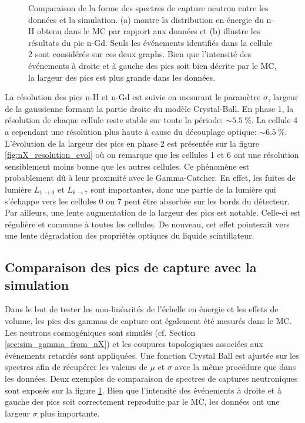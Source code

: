 {\begin{figure}[h!]
\caption[Comparaison de la forme des spectres de capture neutron entre les données et la simulation]{Comparaison de la forme des spectres de capture neutron entre les données et la simulation. (a) montre la distribution en énergie du n-H obtenu dans le MC par rapport aux données et (b) illustre les résultats du pic n-Gd. Seuls les événements identifiés dans la cellule 2 sont considérés sur ces deux graphs. Bien que l'intensité des événements à droite et à gauche des pics soit bien décrite par le MC, la largeur des pics est plus grande dans les données.}
\label{fig:comparison_nX_MC_Data_peaks_shape}

\end{figure}

}

La résolution des pics n-H et n-Gd est suivie en mesurant le paramètre $\sigma$, largeur de la gaussienne formant la partie droite du modèle Crystal-Ball. En phase 1, la résolution de chaque cellule reste stable sur toute la période: $\sim \SI{5.5}{\%}$. La cellule 4 a cependant une résolution plus haute à cause du découplage optique: $\sim \SI{6.5}{\%}$. L'évolution de la largeur des pics en phase 2 est présentée sur la figure \ref{fig:nX_resolution_evol} où on remarque que les cellules 1 et 6 ont une résolution sensiblement moins bonne que les autres cellules. Ce phénomène est probablement dû à leur proximité avec le Gamma-Catcher. En effet, les fuites de lumière $L_{1 \rightarrow 0}$ et $L_{6 \rightarrow 7}$ sont importantes, donc une partie de la lumière qui s'échappe vers les cellules 0 ou 7 peut être absorbée sur les bords du détecteur. Par ailleurs, une lente augmentation de la largeur des pics est notable. Celle-ci est régulière et commune à toutes les cellules. De nouveau, cet effet pointerait vers une lente dégradation des propriétés optiques du liquide scintillateur.\\

\subsection{Comparaison des pics de capture avec la simulation}

Dans le but de tester les non-linéarités de l'échelle en énergie et les effets de volume, les pics des gammas de capture ont également été mesurés dans le MC. Les neutrons cosmogéniques sont simulés (cf. Section \ref{sec:sim_gamma_from_nX}) et les coupures topologiques associées aux événements retardés sont appliquées. Une fonction Crystal Ball est ajustée sur les spectres afin de récupérer les valeurs de $\mu$ et $\sigma$ avec la même procédure que dans les données. Deux exemples de comparaison de spectres de captures neutroniques sont exposés sur la figure \ref{fig:comparison_nX_MC_Data_peaks_shape}. Bien que l'intensité des événements à droite et à gauche des pics soit correctement reproduite par le MC, les données ont une largeur $\sigma$ plus importante.\\

